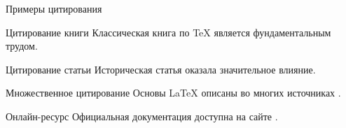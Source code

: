 \documentclass[aspectratio=169, 12pt]{beamer}
\begin{document}
\begin{frame}{Примеры цитирования}
  \begin{exampleblock}{Цитирование книги}
    Классическая книга по TeX \parencite{knuth1984} является фундаментальным трудом.
  \end{exampleblock}
  
  \begin{exampleblock}{Цитирование статьи}
    Историческая статья \textcite{dijkstra1968} оказала значительное влияние.
  \end{exampleblock}
  
  \begin{exampleblock}{Множественное цитирование}
    Основы LaTeX описаны во многих источниках \parencite{knuth1984, lamport1994, mittelbach2004}.
  \end{exampleblock}
  
  \begin{exampleblock}{Онлайн-ресурс}
    Официальная документация доступна на сайте \parencite{latex-project}.
  \end{exampleblock}
\end{frame}
\end{document}
